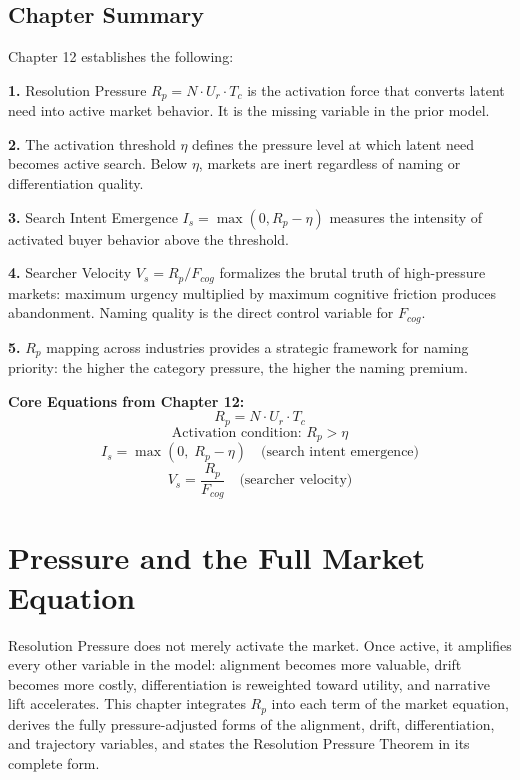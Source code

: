 \documentclass[12pt, openany]{book}
\theoremstyle{thmstyle}
\theoremstyle{defstyle}
\begin{document}
\section{Chapter Summary}

Chapter 12 establishes the following:

\textbf{1.} Resolution Pressure $R_p = N \cdot U_r \cdot T_c$ is the activation force that converts latent need into active market behavior. It is the missing variable in the prior model.

\textbf{2.} The activation threshold $\eta$ defines the pressure level at which latent need becomes active search. Below $\eta$, markets are inert regardless of naming or differentiation quality.

\textbf{3.} Search Intent Emergence $I_s = \max(0, R_p - \eta)$ measures the intensity of activated buyer behavior above the threshold.

\textbf{4.} Searcher Velocity $V_s = R_p / F_{cog}$ formalizes the brutal truth of high-pressure markets: maximum urgency multiplied by maximum cognitive friction produces abandonment. Naming quality is the direct control variable for $F_{cog}$.

\textbf{5.} $R_p$ mapping across industries provides a strategic framework for naming priority: the higher the category pressure, the higher the naming premium.

\begin{equationbox}
\textbf{Core Equations from Chapter 12:}
\[
R_p = N \cdot U_r \cdot T_c
\]
\[
\text{Activation condition: } R_p > \eta
\]
\[
I_s = \max(0,\; R_p - \eta) \quad \text{(search intent emergence)}
\]
\[
V_s = \frac{R_p}{F_{cog}} \quad \text{(searcher velocity)}
\]
\end{equationbox}

\chapter{Pressure and the Full Market Equation}

\begin{keybox}
Resolution Pressure does not merely activate the market. Once active, it amplifies every other variable in the model: alignment becomes more valuable, drift becomes more costly, differentiation is reweighted toward utility, and narrative lift accelerates. This chapter integrates $R_p$ into each term of the market equation, derives the fully pressure-adjusted forms of the alignment, drift, differentiation, and trajectory variables, and states the Resolution Pressure Theorem in its complete form.
\end{keybox}
\end{document}
